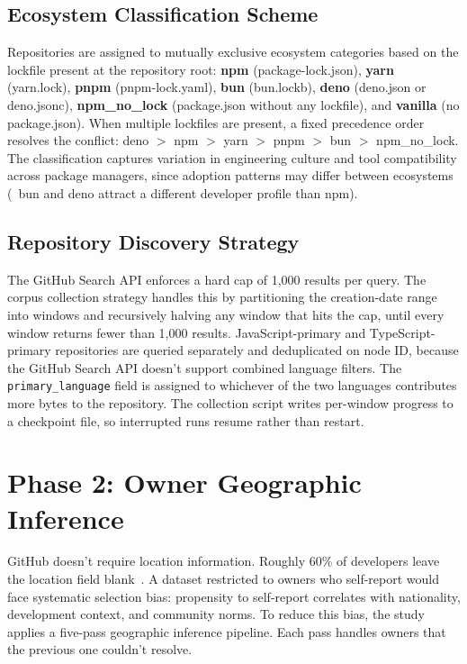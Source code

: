 \subsection{Ecosystem Classification Scheme}

Repositories are assigned to mutually exclusive ecosystem categories based on the lockfile present at the repository root: \textbf{npm} (package-lock.json), \textbf{yarn} (yarn.lock), \textbf{pnpm} (pnpm-lock.yaml), \textbf{bun} (bun.lockb), \textbf{deno} (deno.json or deno.jsonc), \textbf{npm\_no\_lock} (package.json without any lockfile), and \textbf{vanilla} (no package.json). When multiple lockfiles are present, a fixed precedence order resolves the conflict: deno $>$ npm $>$ yarn $>$ pnpm $>$ bun $>$ npm\_no\_lock. The classification captures variation in engineering culture and tool compatibility across package managers, since adoption patterns may differ between ecosystems (\eg\ bun and deno attract a different developer profile than npm).

\subsection{Repository Discovery Strategy}

The GitHub Search API enforces a hard cap of 1,000 results per query. The corpus collection strategy handles this by partitioning the creation-date range into windows and recursively halving any window that hits the cap, until every window returns fewer than 1,000 results. JavaScript-primary and TypeScript-primary repositories are queried separately and deduplicated on node ID, because the GitHub Search API doesn't support combined language filters. The \texttt{primary\_language} field is assigned to whichever of the two languages contributes more bytes to the repository. The collection script writes per-window progress to a checkpoint file, so interrupted runs resume rather than restart.

\section{Phase 2: Owner Geographic Inference}
\label{sec:meth:geography}

GitHub doesn't require location information. Roughly 60\% of developers leave the location field blank~\cite{wachs2022}. A dataset restricted to owners who self-report would face systematic selection bias: propensity to self-report correlates with nationality, development context, and community norms. To reduce this bias, the study applies a five-pass geographic inference pipeline. Each pass handles owners that the previous one couldn't resolve.

